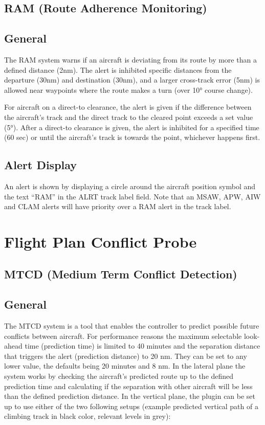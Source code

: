\documentclass[11pt,a4paper,oldfontcommands]{memoir}
\begin{document}
\subsection{RAM (Route Adherence Monitoring)}

\subsection*{General}

The RAM system warns if an aircraft is deviating from its route by more than a defined distance (2nm). The alert is inhibited specific distances from the departure (30nm) and destination (30nm), and a larger cross-track error (5nm) is allowed near waypoints where the route makes a turn (over 10° course change).

For aircraft on a direct-to clearance, the alert is given if the difference between the aircraft’s track and the direct track to the cleared point exceeds a set value (5°). After a direct-to clearance is given, the alert is inhibited for a specified time (60 sec) or until the aircraft’s track is towards the point, whichever happens first.

\subsection*{Alert Display}

An alert is shown by displaying a circle around the aircraft position symbol and the text “RAM” in the ALRT track label field. Note that an MSAW, APW, AIW and CLAM alerts will have priority over a RAM alert in the track label.

\section{Flight Plan Conflict Probe}

\subsection{MTCD (Medium Term Conflict Detection)}

\subsection*{General}

The MTCD system is a tool that enables the controller to predict possible future conflicts between aircraft. For performance reasons the maximum selectable look-ahead time (prediction time) is limited to 40 minutes and the separation distance that triggers the alert (prediction distance) to 20 nm. They can be set to any lower value, the defaults being 20 minutes and 8 nm.
In the lateral plane the system works by checking the aircraft’s predicted route up to the defined prediction time and calculating if the separation with other aircraft will be less than the defined prediction distance.
In the vertical plane, the plugin can be set up to use either of the two following setups (example predicted vertical path of a climbing track in black color, relevant levels in grey):
\end{document}

